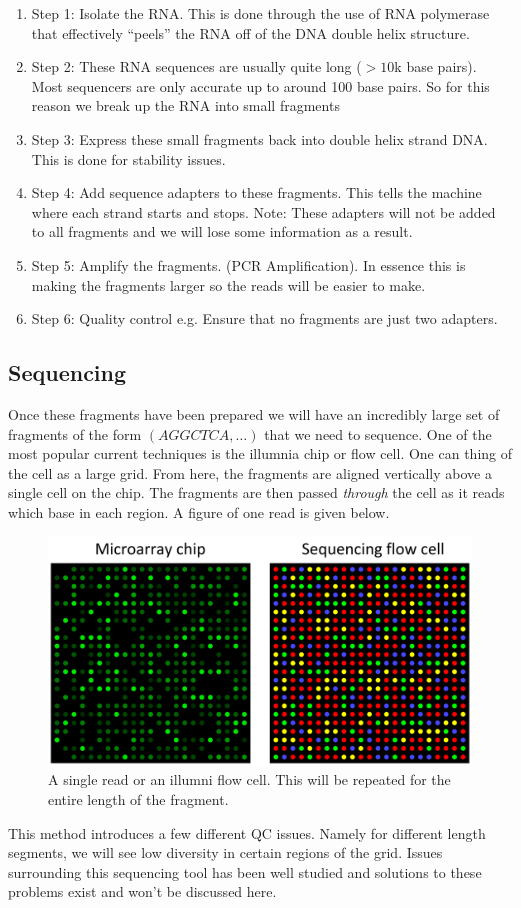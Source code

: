 \documentclass[11pt]{article}
\begin{document}
\begin{enumerate}
	\item Step 1: Isolate the RNA. This is done through the use of RNA polymerase that effectively ``peels'' the RNA off of the DNA double helix structure. 
	\item Step 2: These RNA sequences are usually quite long ($>10$k base pairs). Most sequencers are only accurate up to around 100 base pairs. So for this reason we break up the RNA into small fragments
	\item Step 3: Express these small fragments back into double helix strand DNA. This is done for stability issues. 
	\item Step 4: Add sequence adapters to these fragments. This tells the machine where each strand starts and stops. Note: These adapters will not be added to all fragments and we will lose some information as a result. 
	\item Step 5: Amplify the fragments. (PCR Amplification). In essence this is making the fragments larger so the reads will be easier to make. 
	\item Step 6: Quality control e.g. Ensure that no fragments are just two adapters.
\end{enumerate}

\subsection{Sequencing}

Once these fragments have been prepared we will have an incredibly large set of fragments of the form $(AGGCTCA,\ldots)$ that we need to sequence. One of the most popular current techniques is the illumnia chip or flow cell. One can thing of the cell as a large grid. From here, the fragments are aligned vertically above a single cell on the chip. The fragments are then passed \textit{through} the cell as it reads which base in each region. A figure of one read is given below. 
\begin{figure}
	\centering
	\includegraphics[scale = 0.25]{pictures/flow_cell.png}
	\caption{A single read or an illumni flow cell. This will be repeated for the entire length of the fragment.}
\end{figure}
This method introduces a few different QC issues. Namely for different length segments, we will see low diversity in certain regions of the grid. Issues surrounding this sequencing tool has been well studied and solutions to these problems exist and won't be discussed here. 
\end{document}
